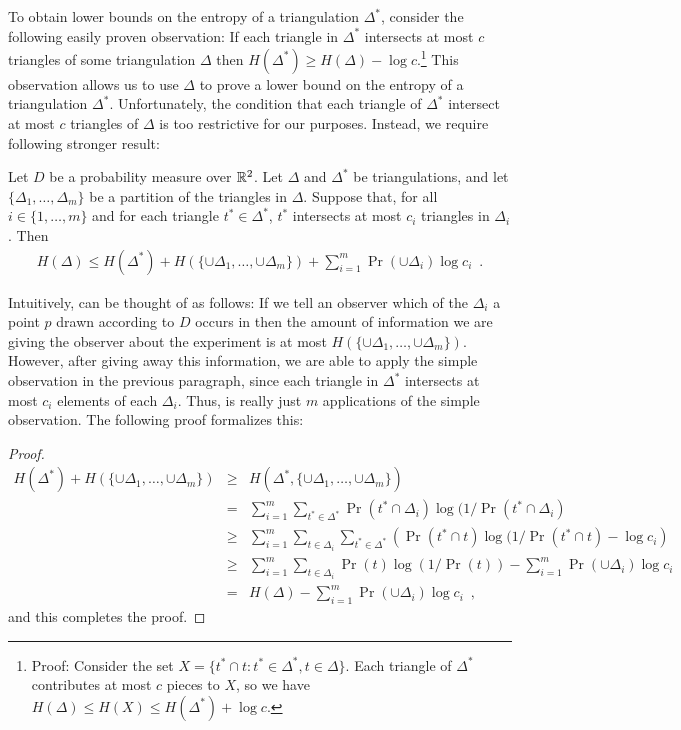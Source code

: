 \documentclass[lotsofwhite]{patmorin}
\begin{document}
To obtain lower bounds on the entropy of a triangulation $\Delta^*$,
consider the following easily proven observation: If each triangle in
$\Delta^*$ intersects at most $c$ triangles of some triangulation
$\Delta$ then $H(\Delta^*) \ge H(\Delta) - \log c$.\footnote{Proof:
Consider the set $X=\{ t^*\cap t : t^*\in\Delta^*, t\in \Delta\}$.
Each triangle of $\Delta^*$ contributes at most $c$ pieces to $X$, so
we have $H(\Delta) \le H(X) \le H(\Delta^*) + \log c$.}  This
observation allows us to use $\Delta$ to prove a lower bound on the
entropy of a triangulation $\Delta^*$.  Unfortunately, the condition
that each triangle of $\Delta^*$ intersect at most $c$ triangles of
$\Delta$ is too restrictive for our purposes.  Instead, we require
following stronger result:

\begin{lem}
Let $D$ be a probability measure over $\mathbb{R}^2$.  Let $\Delta$ and
$\Delta^*$ be triangulations, and let $\{\Delta_1,\ldots,\Delta_m\}$
be a partition of the triangles in $\Delta$.  Suppose that, for all
$i\in\{1,\ldots,m\}$ and for each triangle $t^*\in\Delta^*$, $t^*$
intersects at most $c_i$ triangles in $\Delta_i$.  Then
\begin{eqnarray*}
   H(\Delta) \le 
	 H(\Delta^*) + H(\{\cup\Delta_1,\ldots,\cup\Delta_m\}) + 
	\sum_{i=1}^m \Pr(\cup\Delta_i)\log c_i
 \enspace . 
\end{eqnarray*}
\end{lem}

Intuitively,  can be thought of as follows:  If we tell
an observer which of the $\Delta_i$ a point $p$ drawn according to $D$
occurs in then the amount of information we are giving the observer
about the experiment is at most
$H(\{\cup\Delta_1,\ldots,\cup\Delta_m\})$.  However, after giving away
this information, we are able to apply the simple observation in the
previous paragraph, since each triangle in $\Delta^*$ intersects at
most $c_i$ elements of each $\Delta_i$.  Thus,  is
really just $m$ applications of the simple observation.  The following
proof formalizes this:

\begin{proof}
\begin{eqnarray*}
   H(\Delta^*)  +H(\{\cup\Delta_1,\ldots,\cup\Delta_m\})
     & \ge & H(\Delta^*,\{\cup\Delta_1,\ldots,\cup\Delta_m\}) \\
     &  =  & \sum_{i=1}^m
              \sum_{t^*\in\Delta^*}
               \Pr(t^*\cap\Delta_i)\log (1/\Pr(t^*\cap\Delta_i) \\
     & \ge & \sum_{i=1}^m
              \sum_{t\in\Delta_i}
               \sum_{t^*\in\Delta^*}
                \left(
                  \Pr(t^*\cap t)\log (1/\Pr(t^*\cap t) - \log c_i
                \right) \\
     & \ge  & \sum_{i=1}^m 
               \sum_{t\in\Delta_i}
                \Pr(t)\log(1/\Pr(t)) 
                -\sum_{i=1}^m \Pr(\cup\Delta_i)\log c_i  \\
     &  =  & H(\Delta) -\sum_{i=1}^m \Pr(\cup\Delta_i)\log c_i
            \enspace ,
\end{eqnarray*}
and this completes the proof.
\end{proof}
\end{document}
